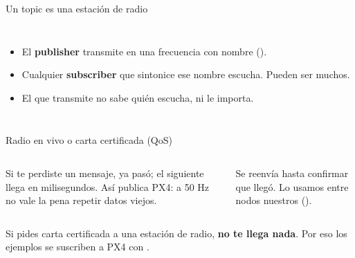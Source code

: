 \documentclass[aspectratio=169,10pt]{beamer}
\begin{document}
\begin{frame}{Un topic es una estación de radio}
  \begin{columns}[c]
    \centering
    \small
    \begin{itemize}
      \item El \textbf{publisher} transmite en una frecuencia con nombre ().
      \item Cualquier \textbf{subscriber} que sintonice ese nombre escucha. Pueden ser muchos.
      \item El que transmite no sabe quién escucha, ni le importa.
    \end{itemize}
  \end{columns}
\end{frame}

\begin{frame}{Radio en vivo o carta certificada (QoS)}
  \begin{columns}[t]
    \begin{idea}[title={\small\bfseries best\_effort: radio en vivo},coltitle=black,colbacktitle=azulclaro]
      \small Si te perdiste un mensaje, ya pasó; el siguiente llega en milisegundos. Así publica PX4: a 50 Hz
      no vale la pena repetir datos viejos.
    \end{idea}
    \begin{idea}[title={\small\bfseries reliable: carta certificada},coltitle=black,colbacktitle=azulclaro]
      \small Se reenvía hasta confirmar que llegó. Lo usamos entre nodos nuestros ().
    \end{idea}
  \end{columns}
  \vspace{0.5em}
  \begin{ojo}
    \small Si pides carta certificada a una estación de radio, \textbf{no te llega nada}. Por eso los ejemplos
    se suscriben a PX4 con .
  \end{ojo}
\end{frame}
\end{document}
